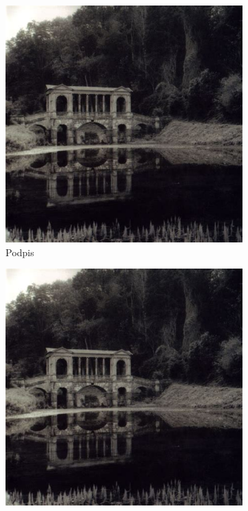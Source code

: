\documentclass[12pt]{article}
\begin{document}
\begin{figure}[h!]
	\centering
	\begin{subfigure}[b]{0.25\linewidth}
		\includegraphics[width=\linewidth]{zdj/morn.jpeg}
		\caption{Podpis}
	\end{subfigure}
	\begin{subfigure}[b]{0.32\linewidth}
		\includegraphics[width=\linewidth]{zdj/morn.jpeg}

\end{subfigure}
\end{figure}
\end{document}
